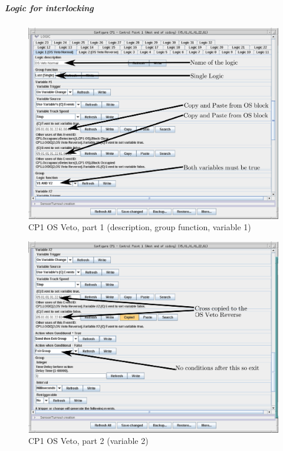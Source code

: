 \subparagraph{Logic for interlocking}
\begin{figure}[hbpt]\begin{centering}%
\includegraphics[width=5in]{CP1-OSVeto-Normal1-Annotated.png}
\caption{CP1 OS Veto, part 1 (description, group function, variable 1)}
\label{fig:CP1-OSVeto-Normal1}
\end{centering}\end{figure}                                                    
\begin{figure}[hbpt]\begin{centering}%
\includegraphics[width=5in]{CP1-OSVeto-Normal2-Annotated.png}
\caption{CP1 OS Veto, part 2 (variable 2)}
\label{fig:CP1-OSVeto-Normal2}
\end{centering}\end{figure}                                                    
